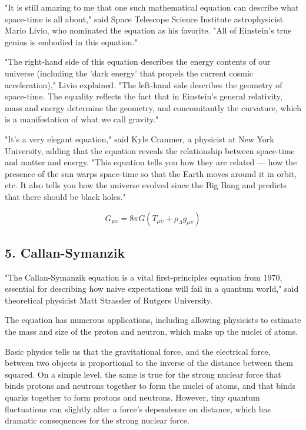 \documentclass[12pt,twocolumn]{article}
\begin{document}
\indent \indent "It is still amazing to me that one such mathematical equation can describe what space-time is all about," said Space Telescope Science Institute astrophysicist Mario Livio, who nominated the equation as his favorite. "All of Einstein's true genius is embodied in this equation."

\indent \indent "The right-hand side of this equation describes the energy contents of our universe (including the 'dark energy' that propels the current cosmic acceleration)," Livio explained. "The left-hand side describes the geometry of space-time. The equality reflects the fact that in Einstein's general relativity, mass and energy determine the geometry, and concomitantly the curvature, which is a manifestation of what we call gravity." 

\indent \indent "It's a very elegant equation," said Kyle Cranmer, a physicist at New York University, adding that the equation reveals the relationship between space-time and matter and energy. "This equation tells you how they are related — how the presence of the sun warps space-time so that the Earth moves around it in orbit, etc. It also tells you how the universe evolved since the Big Bang and predicts that there should be black holes." \cite{ClaraM}

	\begin{equation}
 	G_{\mu\upsilon}=8\pi G(T_{\mu\upsilon}+\rho_{\Lambda}g_{\mu\upsilon})
	\end{equation}

\subsection*{5. Callan-Symanzik}
\indent \indent  "The Callan-Symanzik equation is a vital first-principles equation from 1970, essential for describing how naive expectations will fail in a quantum world," said theoretical physicist Matt Strassler of Rutgers University.

The equation has numerous applications, including allowing physicists to estimate the mass and size of the proton and neutron, which make up the nuclei of atoms.

Basic physics tells us that the gravitational force, and the electrical force, between two objects is proportional to the inverse of the distance between them squared. On a simple level, the same is true for the strong nuclear force that binds protons and neutrons together to form the nuclei of atoms, and that binds quarks together to form protons and neutrons. However, tiny quantum fluctuations can slightly alter a force's dependence on distance, which has dramatic consequences for the strong nuclear force.
\end{document}
